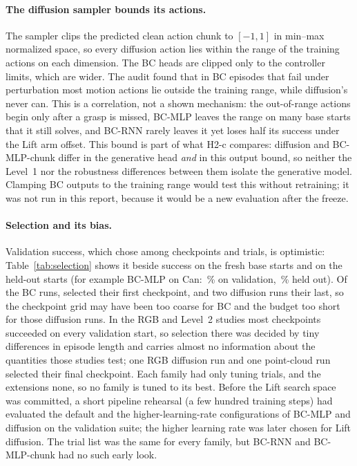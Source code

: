 \paragraph{The diffusion sampler bounds its actions.} The sampler clips the predicted clean
action chunk to $[-1, 1]$ in min--max normalized space, so every diffusion action lies within
the range of the training actions on each dimension. The BC heads are clipped only to the
controller limits, which are wider. The audit found that in BC episodes that fail under perturbation most motion actions lie
outside the training range, while diffusion's never can. This is a correlation, not a shown
mechanism: the out-of-range actions begin only after a grasp is missed, BC-MLP leaves the
range on many base starts that it still solves, and BC-RNN rarely leaves it yet loses half
its success under the Lift arm offset. This bound is part of what H2-c compares: diffusion and BC-MLP-chunk differ in the
generative head \emph{and} in this output bound, so neither the Level~1 nor the robustness
differences between them isolate the generative model. Clamping BC outputs to the training
range would test this without retraining; it was not run in this report, because it would be
a new evaluation after the freeze.

\paragraph{Selection and its bias.} Validation success, which chose among 
checkpoints and  trials, is optimistic: Table~\ref{tab:selection} shows it
beside success on the fresh base starts and on the held-out starts (for example BC-MLP on
Can: \,\% on validation, \,\% held out).
Of the  BC runs,  selected their first checkpoint, and two
diffusion runs their last, so the checkpoint grid may have been too coarse for BC and the
budget too short for those diffusion runs. In the RGB and Level~2 studies most checkpoints succeeded on
every validation start, so selection there was decided by tiny differences in episode length
and carries almost no information about the quantities those studies test; one RGB diffusion
run and one point-cloud run selected their final checkpoint. Each family had only
 tuning trials, and the extensions none, so no family is tuned to its best. Before the Lift
search space was committed, a short pipeline rehearsal (a few hundred training steps) had
evaluated the default and the higher-learning-rate configurations of BC-MLP and diffusion on
the validation suite; the higher learning rate was later chosen for Lift diffusion. The trial
list was the same for every family, but BC-RNN and BC-MLP-chunk had no such early look.

